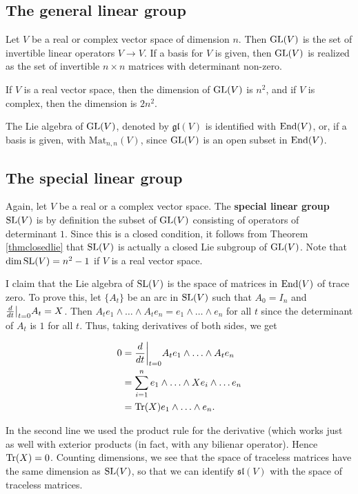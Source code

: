 \documentclass[11pt, english]{article}
\begin{document}
\subsection{The general linear group}

Let $V$ be a real or complex vector space of dimension $n$. Then $\operatorname{GL}(V)$ is the set of invertible linear operators $V \to V$. If a basis for $V$ is given, then $\operatorname{GL}(V)$ is realized as the set of invertible $n \times n$ matrices with determinant non-zero.

If $V$ is a real vector space, then the dimension of $\operatorname{GL}(V)$ is $n^2$, and if $V$ is complex, then the dimension is $2n^2$. 

The Lie algebra of $\operatorname{GL}(V)$, denoted by $\mathfrak {gl}(V)$ is identified with $\operatorname{End}(V)$, or, if a basis is given, with $\mathrm{Mat}_{n,n}(V)$, since $\operatorname{GL}(V)$ is an open subset in $\operatorname{End}(V)$.

\subsection{The special linear group}

Again, let $V$ be a real or a complex vector space. The \textbf{special linear group} $\operatorname{SL}(V)$ is by definition the subset of $\operatorname{GL}(V)$ consisting of operators of determinant $1$. Since this is a closed condition, it follows from Theorem \ref{thmclosedlie} that $\operatorname{SL}(V)$ is actually a closed Lie subgroup of $\operatorname{GL}(V)$. Note that $\dim \operatorname{SL}(V) = n^2-1$ if $V$ is a real vector space.

I claim that the Lie algebra of $\operatorname{SL}(V)$ is the space of matrices in $\operatorname{End}(V)$ of trace zero. To prove this, let $\{ A_t \}$ be an arc in $\operatorname{SL}(V)$ such that $A_0 = I_n$ and $\restr{\frac{d}{dt}}{t=0} A_t =X$. Then $A_t e_1 \wedge \ldots  \wedge A_t e_n = e_1 \wedge \ldots \wedge e_n$ for all $t$ since the determinant of $A_t$ is $1$ for all $t$. Thus, taking derivatives of both sides, we get

\begin{align*}
0 &= \restr{ \frac{d}{dt}}{t=0} A_t e_1 \wedge \ldots \wedge A_t e_n \\
&= \sum_{i=1}^n e_1 \wedge \ldots \wedge X e_i \wedge \ldots e_n \\
&= \tr(X) e_1 \wedge \ldots \wedge e_n.
\end{align*}

In the second line we used the product rule for the derivative (which works just as well with exterior products (in fact, with any bilienar operator). Hence $\operatorname{Tr}(X)=0$. Counting dimensions, we see that the space of traceless matrices have the same dimension as $\operatorname{SL}(V)$, so that we can identify $\mathfrak{sl}(V)$ with the space of traceless matrices.
\end{document}
